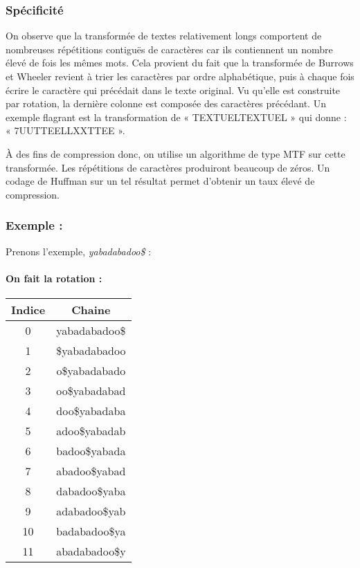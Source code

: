 \subsubsection{Spécificité}
On observe que la transformée de textes relativement longs comportent de nombreuses répétitions contiguës de caractères car ils contiennent un nombre élevé de fois les mêmes mots. Cela provient du fait que la transformée de Burrows et Wheeler revient à trier les caractères par ordre alphabétique, puis à chaque fois écrire le caractère qui précédait dans le texte original. Vu qu'elle est construite par rotation, la dernière colonne est composée des caractères précédant. Un exemple flagrant est la transformation de « TEXTUELTEXTUEL » qui donne : « 7UUTTEELLXXTTEE ».

À des fins de compression donc, on utilise un algorithme de type MTF sur cette transformée. Les répétitions de caractères produiront beaucoup de zéros. Un codage de Huffman sur un tel résultat permet d'obtenir un taux élevé de compression. 

\subsubsection{Exemple :}
\par Prenons l'exemple, \textit{yabadabadoo\$} : \\ 

\paragraph{On fait la rotation :}

\begin{tabular}{|c|c|}
    \hline
    Indice & Chaine \\
    \hline
    0 & yabadabadoo\$\\
    \hline
    1 & \$yabadabadoo\\
    \hline
    2 & o\$yabadabado\\
    \hline
    3 & oo\$yabadabad\\
    \hline
    4 & doo\$yabadaba\\
    \hline
    5 & adoo\$yabadab\\
    \hline
    6 & badoo\$yabada\\
    \hline
    7 & abadoo\$yabad\\
    \hline
    8 & dabadoo\$yaba\\
    \hline
    9 & adabadoo\$yab\\
    \hline
    10 & badabadoo\$ya\\
    \hline
    11 & abadabadoo\$y\\
    \hline
\end{tabular}


